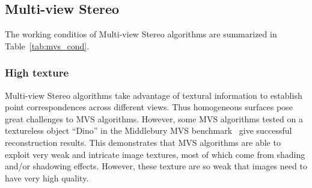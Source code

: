 \subsection{Multi-view Stereo}
The working conditios of Multi-view Stereo algorithms are summarized in Table~\ref{tab:mvs_cond}.

\subsubsection{High texture}
Multi-view Stereo algorithms take advantage of textural information to establish point correspondences across different views. Thus homogeneous surfaces pose great challenges to MVS algorithms. However, some MVS algorithms tested on a textureless object ``Dino'' in the Middlebury MVS benchmark~\cite{seitz2006comparison} give successful reconstruction results. This demonstrates that MVS algorithms are able to exploit very weak and intricate image textures, most of which come from shading and/or shadowing effects. However, these texture are so weak that images need to have very high quality.


